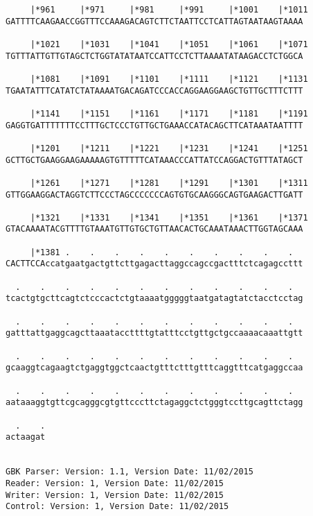 \documentclass{article}
\begin{document}
\begin{Verbatim}
     |*961     |*971     |*981     |*991     |*1001    |*1011
GATTTTCAAGAACCGGTTTCCAAAGACAGTCTTCTAATTCCTCATTAGTAATAAGTAAAA
                                                            
     |*1021    |*1031    |*1041    |*1051    |*1061    |*1071
TGTTTATTGTTGTAGCTCTGGTATATAATCCATTCCTCTTAAAATATAAGACCTCTGGCA
                                                            
     |*1081    |*1091    |*1101    |*1111    |*1121    |*1131
TGAATATTTCATATCTATAAAATGACAGATCCCACCAGGAAGGAAGCTGTTGCTTTCTTT
                                                            
     |*1141    |*1151    |*1161    |*1171    |*1181    |*1191
GAGGTGATTTTTTTCCTTTGCTCCCTGTTGCTGAAACCATACAGCTTCATAAATAATTTT
                                                            
     |*1201    |*1211    |*1221    |*1231    |*1241    |*1251
GCTTGCTGAAGGAAGAAAAAGTGTTTTTCATAAACCCATTATCCAGGACTGTTTATAGCT
                                                            
     |*1261    |*1271    |*1281    |*1291    |*1301    |*1311
GTTGGAAGGACTAGGTCTTCCCTAGCCCCCCCAGTGTGCAAGGGCAGTGAAGACTTGATT
                                                            
     |*1321    |*1331    |*1341    |*1351    |*1361    |*1371
GTACAAAATACGTTTTGTAAATGTTGTGCTGTTAACACTGCAAATAAACTTGGTAGCAAA
                                                            
     |*1381 .    .    .    .    .    .    .    .    .    .  
CACTTCCAccatgaatgactgttcttgagacttaggccagccgactttctcagagccttt
                                                            
  .    .    .    .    .    .    .    .    .    .    .    .  
tcactgtgcttcagtctcccactctgtaaaatgggggtaatgatagtatctacctcctag
                                                            
  .    .    .    .    .    .    .    .    .    .    .    .  
gatttattgaggcagcttaaataccttttgtatttcctgttgctgccaaaacaaattgtt
                                                            
  .    .    .    .    .    .    .    .    .    .    .    .  
gcaaggtcagaagtctgaggtggctcaactgtttctttgtttcaggtttcatgaggccaa
                                                            
  .    .    .    .    .    .    .    .    .    .    .    .  
aataaaggtgttcgcagggcgtgttcccttctagaggctctgggtccttgcagttctagg
                                                            
  .    .
actaagat
        
        
GBK Parser: Version: 1.1, Version Date: 11/02/2015
Reader: Version: 1, Version Date: 11/02/2015
Writer: Version: 1, Version Date: 11/02/2015
Control: Version: 1, Version Date: 11/02/2015
\end{Verbatim}
\end{document}
